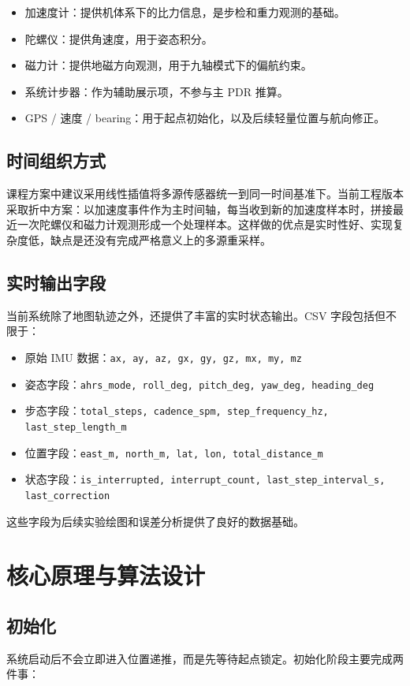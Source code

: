 \documentclass[12pt,a4paper]{ctexart}
\begin{document}
\begin{itemize}
    \item 加速度计：提供机体系下的比力信息，是步检和重力观测的基础。
    \item 陀螺仪：提供角速度，用于姿态积分。
    \item 磁力计：提供地磁方向观测，用于九轴模式下的偏航约束。
    \item 系统计步器：作为辅助展示项，不参与主 PDR 推算。
    \item GPS / 速度 / bearing：用于起点初始化，以及后续轻量位置与航向修正。
\end{itemize}

\subsection{时间组织方式}
课程方案中建议采用线性插值将多源传感器统一到同一时间基准下。当前工程版本采取折中方案：以加速度事件作为主时间轴，每当收到新的加速度样本时，拼接最近一次陀螺仪和磁力计观测形成一个处理样本。这样做的优点是实时性好、实现复杂度低，缺点是还没有完成严格意义上的多源重采样。

\subsection{实时输出字段}
当前系统除了地图轨迹之外，还提供了丰富的实时状态输出。CSV 字段包括但不限于：

\begin{itemize}
    \item 原始 IMU 数据：\texttt{ax, ay, az, gx, gy, gz, mx, my, mz}
    \item 姿态字段：\texttt{ahrs\_mode, roll\_deg, pitch\_deg, yaw\_deg, heading\_deg}
    \item 步态字段：\texttt{total\_steps, cadence\_spm, step\_frequency\_hz, last\_step\_length\_m}
    \item 位置字段：\texttt{east\_m, north\_m, lat, lon, total\_distance\_m}
    \item 状态字段：\texttt{is\_interrupted, interrupt\_count, last\_step\_interval\_s, last\_correction}
\end{itemize}

这些字段为后续实验绘图和误差分析提供了良好的数据基础。

\section{核心原理与算法设计}
\subsection{初始化}
系统启动后不会立即进入位置递推，而是先等待起点锁定。初始化阶段主要完成两件事：
\end{document}
